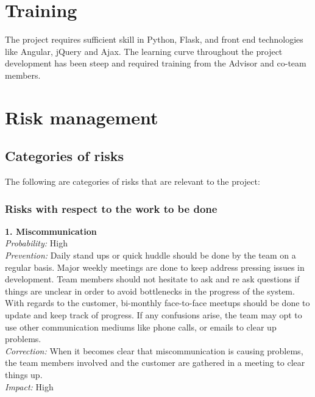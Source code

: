 \documentclass{report}
\begin{document}

\section{Training}
The project requires sufficient skill in Python, Flask, and front end technologies like Angular, jQuery and Ajax. The learning curve throughout the project development has been steep and required training from the Advisor and co-team members. 

\section{Risk management}

\subsection{Categories of risks}
The following are categories of risks that are relevant to the project: 

\subsubsection{Risks with respect to the work to be done}
\textbf{1. Miscommunication} \\
\textit{Probability:} High \\
\textit{Prevention:} Daily stand ups or quick huddle should be done by the team on a regular basis. Major weekly meetings are done to keep address pressing issues in development. Team members should not hesitate to ask and re ask questions if things are unclear in order to avoid bottlenecks in the progress of the system. With regards to the customer, bi-monthly face-to-face meetups should be done to update and keep track of progress. If any confusions arise, the team may opt to use other communication mediums like phone calls, or emails to clear up problems. \\
\textit{Correction:} When it becomes clear that miscommunication is causing problems, the team members involved and the customer are gathered in a meeting to clear things up. \\
\textit{Impact:} High \\

\end{document}
